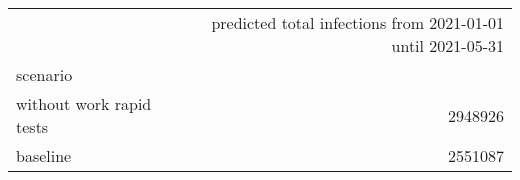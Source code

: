 \begin{tabular}{lr}
\toprule
{} &  predicted total infections from 2021-01-01 until 2021-05-31 \\
scenario                  &                                                              \\
\midrule
 without work rapid tests &                                            2948926 \\
 baseline                 &                                            2551087 \\
\bottomrule
\end{tabular}
